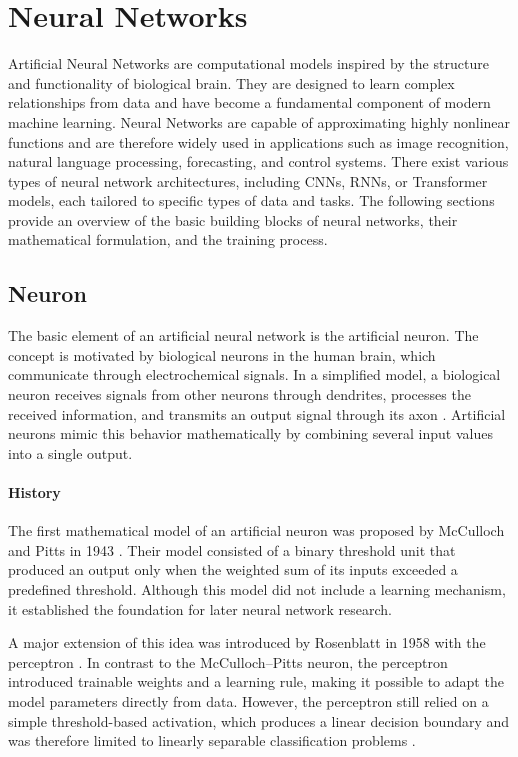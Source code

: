 

\section{Neural Networks}
Artificial Neural Networks are computational models inspired by the structure and functionality of biological brain. They are designed to learn complex relationships from data and have become a fundamental component of modern machine learning. Neural Networks are capable of approximating highly nonlinear functions and are therefore widely used in applications such as image recognition, natural language processing, forecasting, and control systems. There exist various types of neural network architectures, including \acfp{CNN}, \acfp{RNN}, or Transformer models, each tailored to specific types of data and tasks. The following sections provide an overview of the basic building blocks of neural networks, their mathematical formulation, and the training process.


\subsection{Neuron}
The basic element of an artificial neural network is the artificial neuron. The concept is motivated by biological neurons in the human brain, which communicate through electrochemical signals. In a simplified model, a biological neuron receives signals from other neurons through dendrites, processes the received information, and transmits an output signal through its axon \cite{Lin2017ArtificialNN}. Artificial neurons mimic this behavior mathematically by combining several input values into a single output.

\paragraph{History}
The first mathematical model of an artificial neuron was proposed by McCulloch and Pitts in 1943 \cite{McCulloch1990ALC}. Their model consisted of a binary threshold unit that produced an output only when the weighted sum of its inputs exceeded a predefined threshold. Although this model did not include a learning mechanism, it established the foundation for later neural network research.

A major extension of this idea was introduced by Rosenblatt in 1958 with the perceptron \cite{Rosenblatt1958ThePA}. In contrast to the McCulloch--Pitts neuron, the perceptron introduced trainable weights and a learning rule, making it possible to adapt the model parameters directly from data. However, the perceptron still relied on a simple threshold-based activation, which produces a linear decision boundary and was therefore limited to linearly separable classification problems \cite{Minsky1969AnIT}.

